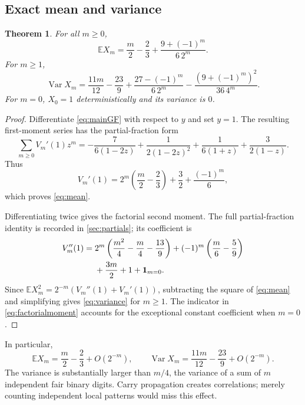 \documentclass[11pt]{article}
\newtheorem{theorem}{Theorem}[section]
\theoremstyle{definition}\newtheorem{definition}[theorem]{Definition}
\theoremstyle{remark}\newtheorem{remark}[theorem]{Remark}
\newcommand{\E}{\mathbb E}
\newcommand{\Var}{\operatorname{Var}}
\newcommand{\ind}{\mathbf 1}
\begin{document}
\subsection{Exact mean and variance}
\begin{theorem}\label{thm:moments}
For all $m\geq0$,
\begin{equation}\label{eq:mean}
 \E X_m=\frac m2-\frac23+\frac{9+(-1)^m}{6\,2^m}.
\end{equation}
For $m\geq1$,
\begin{equation}\label{eq:variance}
 \Var X_m=\frac{11m}{12}-\frac{23}{9}
 +\frac{27-(-1)^m}{6\,2^m}
 -\frac{(9+(-1)^m)^2}{36\,4^m}.
\end{equation}
For $m=0$, $X_0=1$ deterministically and its variance is $0$.
\end{theorem}
\begin{proof}
Differentiate \eqref{eq:mainGF} with respect to $y$ and set $y=1$.
The resulting first-moment series has the partial-fraction form
\begin{equation}\label{eq:firstpartial}
 \sum_{m\geq0}V_m'(1)z^m
 =-\frac{7}{6(1-2z)}+\frac1{2(1-2z)^2}
   +\frac1{6(1+z)}+\frac3{2(1-z)}.
\end{equation}
Thus
\[
 V_m'(1)=2^m\left(\frac m2-\frac23\right)
              +\frac32+\frac{(-1)^m}{6},
\]
which proves \eqref{eq:mean}.

Differentiating twice gives the factorial second moment. The full
partial-fraction identity is recorded in \cref{sec:partials}; its
coefficient is
\begin{align}\label{eq:factorialmoment}
 V_m''(1)={}&2^m\left(\frac{m^2}4-\frac m4-\frac{13}9\right)
 +(-1)^m\left(\frac m6-\frac59\right)\notag\\
 &+\frac{3m}{2}+1+\ind_{m=0}.
\end{align}
Since $\E X_m^2=2^{-m}(V_m''(1)+V_m'(1))$, subtracting the square of
\eqref{eq:mean} and simplifying gives \eqref{eq:variance} for $m\geq1$.
The indicator in \eqref{eq:factorialmoment} accounts for the exceptional
constant coefficient when $m=0$.
\end{proof}

In particular,
\begin{equation}\label{eq:momentasymp}
 \E X_m=\frac m2-\frac23+O(2^{-m}),\qquad
 \Var X_m=\frac{11m}{12}-\frac{23}{9}+O(2^{-m}).
\end{equation}
The variance is substantially larger than $m/4$, the variance of a sum
of $m$ independent fair binary digits. Carry propagation creates
correlations; merely counting independent local patterns would miss
this effect.
\end{document}
